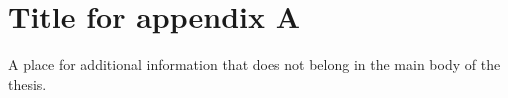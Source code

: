 \chapter{Title for appendix A}
\label{ch:appA} %

A place for additional information that does not belong in the main body of the thesis.
\blindtext